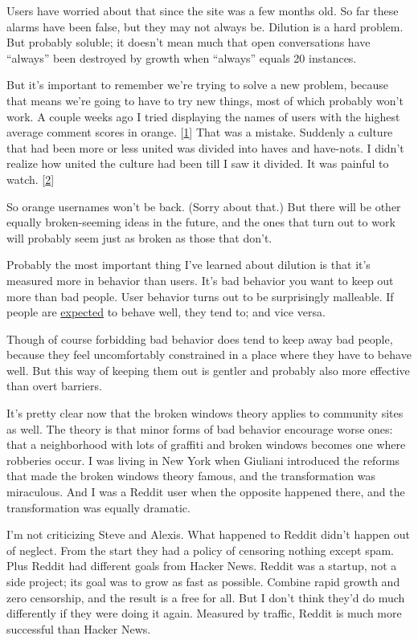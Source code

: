 Users have worried about that since the site was a few months old. So
far these alarms have been false, but they may not always be. Dilution
is a hard problem. But probably soluble; it doesn't mean much that open
conversations have ``always'' been destroyed by growth when ``always''
equals 20 instances.

But it's important to remember we're trying to solve a new problem,
because that means we're going to have to try new things, most of which
probably won't work. A couple weeks ago I tried displaying the names of
users with the highest average comment scores in orange.
{[}\hyperref[f1n]{1}{]} That was a mistake. Suddenly a culture that had
been more or less united was divided into haves and have-nots. I didn't
realize how united the culture had been till I saw it divided. It was
painful to watch. {[}\hyperref[f2n]{2}{]}

So orange usernames won't be back. (Sorry about that.) But there will be
other equally broken-seeming ideas in the future, and the ones that turn
out to work will probably seem just as broken as those that don't.

Probably the most important thing I've learned about dilution is that
it's measured more in behavior than users. It's bad behavior you want to
keep out more than bad people. User behavior turns out to be
surprisingly malleable. If people are
\href{http://ycombinator.com/newswelcome.html}{expected} to behave well,
they tend to; and vice versa.

Though of course forbidding bad behavior does tend to keep away bad
people, because they feel uncomfortably constrained in a place where
they have to behave well. But this way of keeping them out is gentler
and probably also more effective than overt barriers.

It's pretty clear now that the broken windows theory applies to
community sites as well. The theory is that minor forms of bad behavior
encourage worse ones: that a neighborhood with lots of graffiti and
broken windows becomes one where robberies occur. I was living in New
York when Giuliani introduced the reforms that made the broken windows
theory famous, and the transformation was miraculous. And I was a Reddit
user when the opposite happened there, and the transformation was
equally dramatic.

I'm not criticizing Steve and Alexis. What happened to Reddit didn't
happen out of neglect. From the start they had a policy of censoring
nothing except spam. Plus Reddit had different goals from Hacker News.
Reddit was a startup, not a side project; its goal was to grow as fast
as possible. Combine rapid growth and zero censorship, and the result is
a free for all. But I don't think they'd do much differently if they
were doing it again. Measured by traffic, Reddit is much more successful
than Hacker News.

